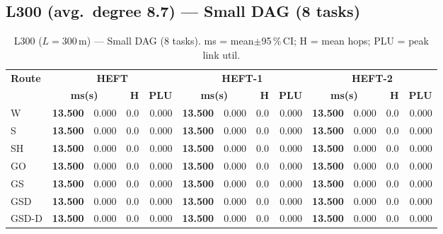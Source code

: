\documentclass[11pt]{article}
\newcommand{\win}[1]{\textcolor{green!50!black}{\textbf{#1}}}
\begin{document}
\subsection{L300 (avg.\ degree 8.7) --- Small DAG (8 tasks)}
\begin{table}[H]\centering\small
\begin{tabular}{l r@{$\pm$}l r r r@{$\pm$}l r r r@{$\pm$}l r r}
\toprule
\textbf{Route} & \multicolumn{4}{c}{\textbf{HEFT}} & \multicolumn{4}{c}{\textbf{HEFT-1}} & \multicolumn{4}{c}{\textbf{HEFT-2}} \\
\cmidrule(lr){2-5}\cmidrule(lr){6-9}\cmidrule(lr){10-13}
& \multicolumn{2}{c}{\textbf{ms(s)}} & \textbf{H} & \textbf{PLU}& \multicolumn{2}{c}{\textbf{ms(s)}} & \textbf{H} & \textbf{PLU}& \multicolumn{2}{c}{\textbf{ms(s)}} & \textbf{H} & \textbf{PLU} \\
\midrule
  W & \win{13.500} & 0.000 & 0.0 & 0.000 & \win{13.500} & 0.000 & 0.0 & 0.000 & \win{13.500} & 0.000 & 0.0 & 0.000 \\
  S & \win{13.500} & 0.000 & 0.0 & 0.000 & \win{13.500} & 0.000 & 0.0 & 0.000 & \win{13.500} & 0.000 & 0.0 & 0.000 \\
  SH & \win{13.500} & 0.000 & 0.0 & 0.000 & \win{13.500} & 0.000 & 0.0 & 0.000 & \win{13.500} & 0.000 & 0.0 & 0.000 \\
  GO & \win{13.500} & 0.000 & 0.0 & 0.000 & \win{13.500} & 0.000 & 0.0 & 0.000 & \win{13.500} & 0.000 & 0.0 & 0.000 \\
  GS & \win{13.500} & 0.000 & 0.0 & 0.000 & \win{13.500} & 0.000 & 0.0 & 0.000 & \win{13.500} & 0.000 & 0.0 & 0.000 \\
  GSD & \win{13.500} & 0.000 & 0.0 & 0.000 & \win{13.500} & 0.000 & 0.0 & 0.000 & \win{13.500} & 0.000 & 0.0 & 0.000 \\
  GSD-D & \win{13.500} & 0.000 & 0.0 & 0.000 & \win{13.500} & 0.000 & 0.0 & 0.000 & \win{13.500} & 0.000 & 0.0 & 0.000 \\
\bottomrule\end{tabular}
\caption{L300 ($L=300$\,m) --- Small DAG (8 tasks). ms = mean$\pm$95\,\%\,CI; H = mean hops; PLU = peak link util.}
\end{table}
\end{document}
